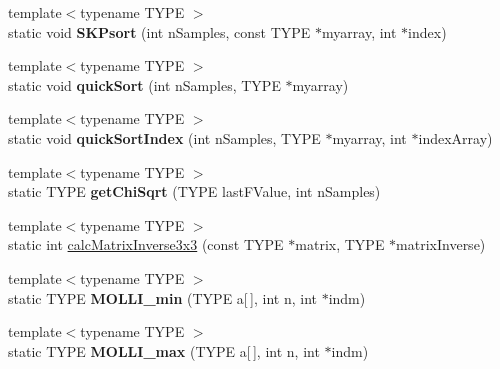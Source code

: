 \begin{DoxyCompactItemize}
\item 
\hypertarget{class_k_w_util_adea3028ddaac44e13ab60460b0e50452}{{\footnotesize template$<$typename T\-Y\-P\-E $>$ }\\static void {\bfseries S\-K\-Psort} (int n\-Samples, const T\-Y\-P\-E $\ast$myarray, int $\ast$index)}\label{class_k_w_util_adea3028ddaac44e13ab60460b0e50452}

\item 
\hypertarget{class_k_w_util_aacc2b444dd10145dea4367714527efa9}{{\footnotesize template$<$typename T\-Y\-P\-E $>$ }\\static void {\bfseries quick\-Sort} (int n\-Samples, T\-Y\-P\-E $\ast$myarray)}\label{class_k_w_util_aacc2b444dd10145dea4367714527efa9}

\item 
\hypertarget{class_k_w_util_aba1906d9b0de1262e0ce837b15e8401f}{{\footnotesize template$<$typename T\-Y\-P\-E $>$ }\\static void {\bfseries quick\-Sort\-Index} (int n\-Samples, T\-Y\-P\-E $\ast$myarray, int $\ast$index\-Array)}\label{class_k_w_util_aba1906d9b0de1262e0ce837b15e8401f}

\item 
\hypertarget{class_k_w_util_a2e55b0bcf1bbf1155654b748a7064cbf}{{\footnotesize template$<$typename T\-Y\-P\-E $>$ }\\static T\-Y\-P\-E {\bfseries get\-Chi\-Sqrt} (T\-Y\-P\-E last\-F\-Value, int n\-Samples)}\label{class_k_w_util_a2e55b0bcf1bbf1155654b748a7064cbf}

\item 
{\footnotesize template$<$typename T\-Y\-P\-E $>$ }\\static int \hyperlink{class_k_w_util_a80504801c382f1ac367bcf0787fb18c2}{calc\-Matrix\-Inverse3x3} (const T\-Y\-P\-E $\ast$matrix, T\-Y\-P\-E $\ast$matrix\-Inverse)
\item 
\hypertarget{class_k_w_util_a6401111c5ce49eb97e1c79bae84b3868}{{\footnotesize template$<$typename T\-Y\-P\-E $>$ }\\static T\-Y\-P\-E {\bfseries M\-O\-L\-L\-I\-\_\-min} (T\-Y\-P\-E a\mbox{[}$\,$\mbox{]}, int n, int $\ast$indm)}\label{class_k_w_util_a6401111c5ce49eb97e1c79bae84b3868}

\item 
\hypertarget{class_k_w_util_af0fee5e9d89e7c029c346804480d5832}{{\footnotesize template$<$typename T\-Y\-P\-E $>$ }\\static T\-Y\-P\-E {\bfseries M\-O\-L\-L\-I\-\_\-max} (T\-Y\-P\-E a\mbox{[}$\,$\mbox{]}, int n, int $\ast$indm)}\label{class_k_w_util_af0fee5e9d89e7c029c346804480d5832}


\end{DoxyCompactItemize}
